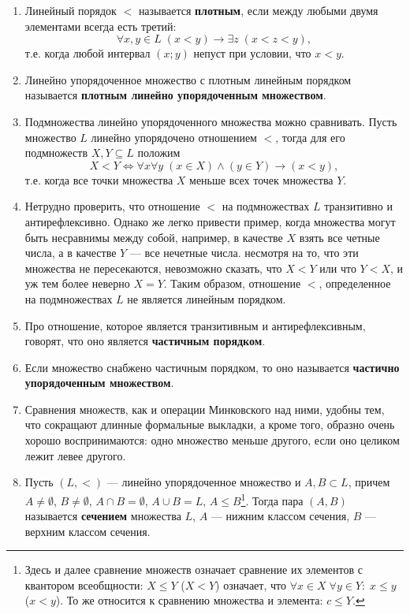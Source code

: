 \begin{enumerate}


\item Линейный порядок $<$ называется \textbf{плотным}, если между любыми двумя элементами всегда есть третий: 
$$
\forall x,y\in L\;(x<y)\to\exists z\; (x<z<y),
$$
т.е. когда любой интервал $(x;y)$ непуст при условии, что $x<y$.
\item Линейно упорядоченное множество с плотным линейным порядком называется \textbf{плотным линейно упорядоченным множеством}.
\item Подмножества линейно упорядоченного множества можно сравнивать. Пусть множество $L$ линейно упорядочено отношением $<$, тогда для его подмножеств $X,Y\subseteq L$ положим
$$
X<Y\Leftrightarrow \forall x\forall y\;(x\in X)\land(y\in Y)\to (x<y),
$$
т.е. когда все точки множества $X$ меньше всех точек множества $Y$.
\item Нетрудно проверить, что отношение $<$ на подмножествах $L$ транзитивно и антирефлексивно. Однако же легко привести пример, когда множества могут быть несравнимы между собой, например, в качестве  $X$ взять все четные числа, а в качестве $Y$ --- все нечетные числа. несмотря на то, что эти множества не пересекаются, невозможно сказать, что $X<Y$ или что $Y<X$, и уж тем более неверно $X=Y$. Таким образом, отношение $<$, определенное на подмножествах $L$ не является линейным порядком.
\item Про отношение, которое является транзитивным и антирефлексивным, говорят, что оно является \textbf{частичным порядком}.
\item Если множество снабжено частичным порядком, то оно называется \textbf{частично упорядоченным множеством}.
\item Сравнения множеств, как и операции Минковского над ними, удобны тем, что сокращают длинные формальные выкладки, а кроме того, образно очень хорошо воспринимаются: одно множество меньше другого, если оно целиком лежит левее другого.

\item Пусть $(L,<)$ --- линейно упорядоченное множество и $A,B\subset L$, причем $A\ne\emptyset$, $B\ne\emptyset$, $A\cap B=\emptyset$, $A\cup B=L$, $A\le B$\footnote{Здесь и далее сравнение множеств означает сравнение их элементов с квантором всеобщности: $X\le Y$ ($X<Y$) означает, что $\forall x \in X\;\forall y\in Y:\; x\le y$ ($x<y$). То же относится к сравнению множества и элемента: $c\le Y$.}. Тогда пара $(A,B)$ называется \textbf{сечением} множества $L$, $A$ --- нижним классом сечения, $B$ --- верхним классом сечения.


\end{enumerate}

